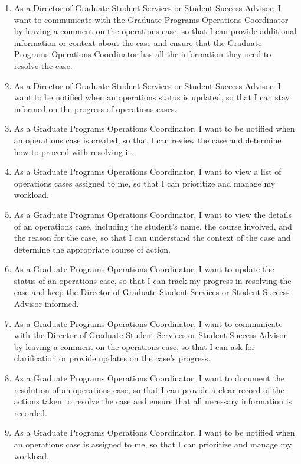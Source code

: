 \documentclass[12pt]{article}
\begin{document}
\begin{appendices}
\begin{enumerate}[label=(\roman*)]
\begin{enumerate}
            \item As a Director of Graduate Student Services or Student Success Advisor, I want to communicate with the Graduate Programs Operations Coordinator by leaving a comment on the operations case, so that I can provide additional information or context about the case and ensure that the Graduate Programs Operations Coordinator has all the information they need to resolve the case.
            \item As a Director of Graduate Student Services or Student Success Advisor, I want to be notified when an operations status is updated, so that I can stay informed on the progress of operations cases.
            \item As a Graduate Programs Operations Coordinator, I want to be notified when an operations case is created, so that I can review the case and determine how to proceed with resolving it.
            \item As a Graduate Programs Operations Coordinator, I want to view a list of operations cases assigned to me, so that I can prioritize and manage my workload.
            \item As a Graduate Programs Operations Coordinator, I want to view the details of an operations case, including the student's name, the course involved, and the reason for the case, so that I can understand the context of the case and determine the appropriate course of action.
            \item As a Graduate Programs Operations Coordinator, I want to update the status of an operations case, so that I can track my progress in resolving the case and keep the Director of Graduate Student Services or Student Success Advisor informed.
            \item As a Graduate Programs Operations Coordinator, I want to communicate with the Director of Graduate Student Services or Student Success Advisor by leaving a comment on the operations case, so that I can ask for clarification or provide updates on the case's progress.
            \item As a Graduate Programs Operations Coordinator, I want to document the resolution of an operations case, so that I can provide a clear record of the actions taken to resolve the case and ensure that all necessary information is recorded.
            \item As a Graduate Programs Operations Coordinator, I want to be notified when an operations case is assigned to me, so that I can prioritize and manage my workload.                       
        \end{enumerate}



\end{enumerate}
\end{appendices}
\end{document}
